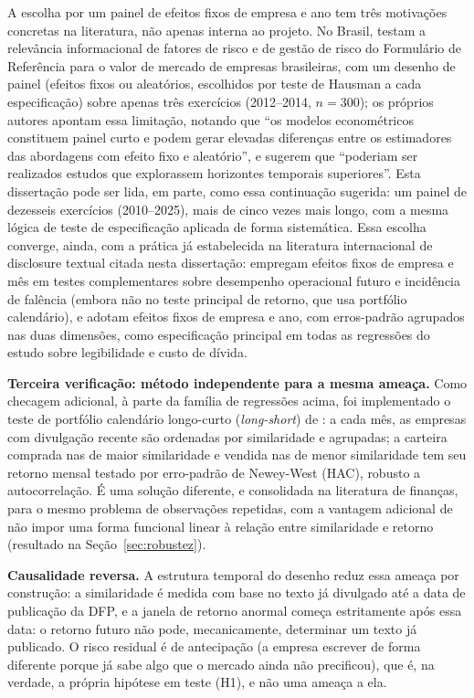 \documentclass[a4paper,12pt]{report}
\begin{document}
A escolha por um painel de efeitos fixos de empresa e ano tem três motivações concretas na literatura, não apenas interna ao projeto. No Brasil,  testam a relevância informacional de fatores de risco e de gestão de risco do Formulário de Referência para o valor de mercado de empresas brasileiras, com um desenho de painel (efeitos fixos ou aleatórios, escolhidos por teste de Hausman a cada especificação) sobre apenas três exercícios (2012--2014, $n=300$); os próprios autores apontam essa limitação, notando que ``os modelos econométricos constituem painel curto e podem gerar elevadas diferenças entre os estimadores das abordagens com efeito fixo e aleatório'', e sugerem que ``poderiam ser realizados estudos que explorassem horizontes temporais superiores''. Esta dissertação pode ser lida, em parte, como essa continuação sugerida: um painel de dezesseis exercícios (2010--2025), mais de cinco vezes mais longo, com a mesma lógica de teste de especificação aplicada de forma sistemática. Essa escolha converge, ainda, com a prática já estabelecida na literatura internacional de disclosure textual citada nesta dissertação:  empregam efeitos fixos de empresa e mês em testes complementares sobre desempenho operacional futuro e incidência de falência (embora não no teste principal de retorno, que usa portfólio calendário), e  adotam efeitos fixos de empresa e ano, com erros-padrão agrupados nas duas dimensões, como especificação principal em todas as regressões do estudo sobre legibilidade e custo de dívida.

\textbf{Terceira verificação: método independente para a mesma ameaça.} Como checagem adicional, à parte da família de regressões acima, foi implementado o teste de portfólio calendário longo-curto (\textit{long-short}) de : a cada mês, as empresas com divulgação recente são ordenadas por similaridade e agrupadas; a carteira comprada nas de maior similaridade e vendida nas de menor similaridade tem seu retorno mensal testado por erro-padrão de Newey-West (HAC), robusto a autocorrelação. É uma solução diferente, e consolidada na literatura de finanças, para o mesmo problema de observações repetidas, com a vantagem adicional de não impor uma forma funcional linear à relação entre similaridade e retorno (resultado na Seção~\ref{sec:robustez}).

\textbf{Causalidade reversa.} A estrutura temporal do desenho reduz essa ameaça por construção: a similaridade é medida com base no texto já divulgado até a data de publicação da DFP, e a janela de retorno anormal começa estritamente após essa data: o retorno futuro não pode, mecanicamente, determinar um texto já publicado. O risco residual é de antecipação (a empresa escrever de forma diferente porque já sabe algo que o mercado ainda não precificou), que é, na verdade, a própria hipótese em teste (H1), e não uma ameaça a ela.
\end{document}
